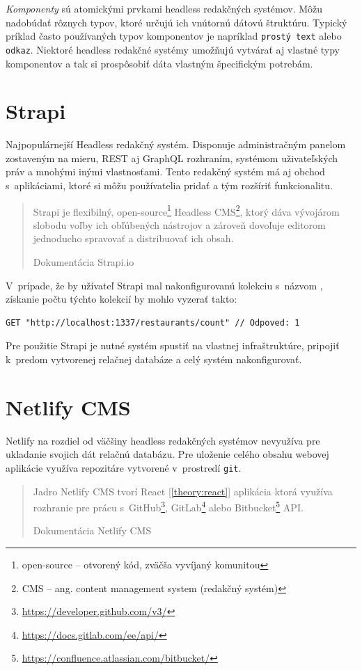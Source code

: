 \noindent \emph{Komponenty} sú atomickými prvkami headless redakčných systémov. Môžu nadobúdať rôznych typov, ktoré určujú ich vnútornú dátovú štruktúru. Typický príklad často používaných typov komponentov je napríklad \texttt{prostý text} alebo \texttt{odkaz}. Niektoré headless redakčné systémy umožňujú vytvárať aj vlastné typy komponentov a tak si prospôsobiť dáta vlastným špecifickým potrebám.

\section{Strapi}
Najpopulárnejší Headless redakčný systém. Disponuje administračným panelom zostaveným na mieru, REST aj GraphQL rozhraním, systémom uživateľských práv a mnohými inými vlastnosťami. Tento redakčný systém má aj obchod s~aplikáciami, ktoré si môžu používatelia pridať a tým rozšíriť funkcionalitu. 

\blockquote[Dokumentácia Strapi.io \cite{StrapiDocs}]{Strapi je flexibilný, open-source\footnote{open-source -- otvorený kód, zväčša vyvíjaný komunitou} Headless CMS\footnote{CMS -- ang. content management system (redakčný systém)}, ktorý dáva vývojárom slobodu voľby ich obľúbených nástrojov a zároveň dovoľuje editorom jednoducho spravovať a distribuovať ich obsah.}

\noindent V~prípade, že by užívateľ Strapi mal nakonfigurovanú kolekciu s~názvom , získanie počtu týchto kolekcií by mohlo vyzerať takto: \\

\begin{lstlisting}[caption=Príklad HTTP požiadavku na REST rozhranie Strapi.]
	GET "http://localhost:1337/restaurants/count" // Odpoved: 1
\end{lstlisting}

\medskip

\noindent Pre použitie Strapi je nutné systém spustiť na vlastnej infraštruktúre, pripojiť k~predom vytvorenej relačnej databáze a celý systém nakonfigurovať.

\section{Netlify CMS}
Netlify na rozdiel od väčšiny headless redakčných systémov nevyužíva pre ukladanie svojich dát relačnú databázu. Pre uloženie celého obsahu webovej aplikácie využíva repozitáre vytvorené v~prostredí \texttt{git}.

\blockquote[Dokumentácia Netlify CMS \cite{NetlifyDocs}]{Jadro Netlify CMS tvorí React [\ref{theory:react}] aplikácia ktorá využíva rozhranie pre prácu s~GitHub\footnote{\href{https://developer.github.com/v3/}{https://developer.github.com/v3/}}, GitLab\footnote{\href{https://docs.gitlab.com/ee/api/}{https://docs.gitlab.com/ee/api/}} alebo Bitbucket\footnote{\href{https://confluence.atlassian.com/bitbucket/}{https://confluence.atlassian.com/bitbucket/}} API.}

